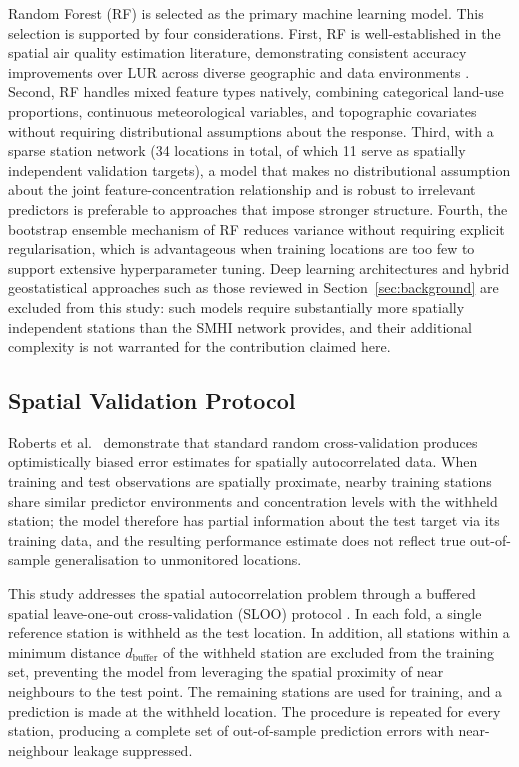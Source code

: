 \documentclass[11pt,a4paper]{article}
\let\oldsubsection\subsection
\renewcommand{\subsection}{\FloatBarrier\oldsubsection}
\begin{document}
Random Forest (RF) is selected as the primary machine learning model. This selection is supported by four considerations. First, RF is well-established in the spatial air quality estimation literature, demonstrating consistent accuracy improvements over LUR across diverse geographic and data environments \cite{agbehadji_ml_aq_review_2024, chen_pm25_interpolation_2021}. Second, RF handles mixed feature types natively, combining categorical land-use proportions, continuous meteorological variables, and topographic covariates without requiring distributional assumptions about the response. Third, with a sparse station network (34 locations in total, of which 11 serve as spatially independent validation targets), a model that makes no distributional assumption about the joint feature-concentration relationship and is robust to irrelevant predictors is preferable to approaches that impose stronger structure. Fourth, the bootstrap ensemble mechanism of RF reduces variance without requiring explicit regularisation, which is advantageous when training locations are too few to support extensive hyperparameter tuning. Deep learning architectures and hybrid geostatistical approaches such as those reviewed in Section~\ref{sec:background} are excluded from this study: such models require substantially more spatially independent stations than the SMHI network provides, and their additional complexity is not warranted for the contribution claimed here.

\subsection{Spatial Validation Protocol}
\label{sec:validation-protocol}

Roberts et al.\ \cite{roberts_spatial_cv_2017} demonstrate that standard random cross-validation produces optimistically biased error estimates for spatially autocorrelated data. When training and test observations are spatially proximate, nearby training stations share similar predictor environments and concentration levels with the withheld station; the model therefore has partial information about the test target via its training data, and the resulting performance estimate does not reflect true out-of-sample generalisation to unmonitored locations.

This study addresses the spatial autocorrelation problem through a buffered spatial leave-one-out cross-validation (SLOO) protocol \cite{valavi_blockcv_2019}. In each fold, a single reference station is withheld as the test location. In addition, all stations within a minimum distance $d_{\text{buffer}}$ of the withheld station are excluded from the training set, preventing the model from leveraging the spatial proximity of near neighbours to the test point. The remaining stations are used for training, and a prediction is made at the withheld location. The procedure is repeated for every station, producing a complete set of out-of-sample prediction errors with near-neighbour leakage suppressed.
\end{document}
